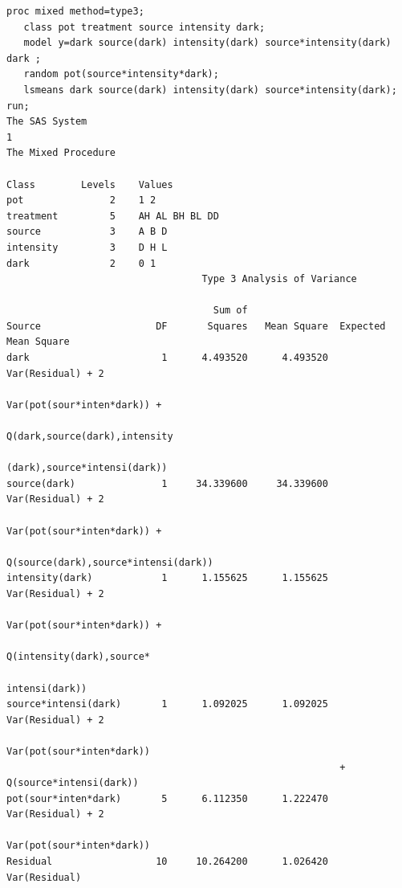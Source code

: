 \newpage
{}
\begin{small}
\begin{verbatim}
proc mixed method=type3;
   class pot treatment source intensity dark;
   model y=dark source(dark) intensity(dark) source*intensity(dark) dark ;
   random pot(source*intensity*dark);
   lsmeans dark source(dark) intensity(dark) source*intensity(dark);
run;
The SAS System                                                                                1
The Mixed Procedure

Class        Levels    Values
pot               2    1 2                           
treatment         5    AH AL BH BL DD                
source            3    A B D                         
intensity         3    D H L                         
dark              2    0 1                           
                                  Type 3 Analysis of Variance
 
                                    Sum of
Source                    DF       Squares   Mean Square  Expected Mean Square
dark                       1      4.493520      4.493520  Var(Residual) + 2                    
                                                          Var(pot(sour*inten*dark)) +          
                                                          Q(dark,source(dark),intensity        
                                                          (dark),source*intensi(dark))         
source(dark)               1     34.339600     34.339600  Var(Residual) + 2                    
                                                          Var(pot(sour*inten*dark)) +          
                                                          Q(source(dark),source*intensi(dark)) 
intensity(dark)            1      1.155625      1.155625  Var(Residual) + 2                    
                                                          Var(pot(sour*inten*dark)) +          
                                                          Q(intensity(dark),source*            
                                                          intensi(dark))                       
source*intensi(dark)       1      1.092025      1.092025  Var(Residual) + 2                    
                                                          Var(pot(sour*inten*dark))            
                                                          + Q(source*intensi(dark))            
pot(sour*inten*dark)       5      6.112350      1.222470  Var(Residual) + 2                    
                                                          Var(pot(sour*inten*dark))            
Residual                  10     10.264200      1.026420  Var(Residual)                        


\end{verbatim}
\end{small}
